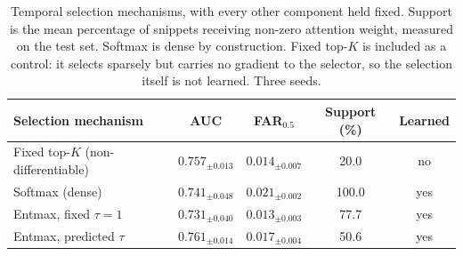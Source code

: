 \begin{table}[htbp]
\centering
\caption{Temporal selection mechanisms, with every other component held fixed. Support is the mean percentage of snippets receiving non-zero attention weight, measured on the test set. Softmax is dense by construction. Fixed top-$K$ is included as a control: it selects sparsely but carries no gradient to the selector, so the selection itself is not learned. Three seeds.}
\label{tab:selection}
\small
\begin{tabular}{lcccc}
\toprule
Selection mechanism & AUC & FAR$_{0.5}$ & Support (\%) & Learned \\
\midrule
Fixed top-$K$ (non-differentiable) & $0.757_{\pm0.013}$ & $0.014_{\pm0.007}$ & 20.0 & no \\
Softmax (dense) & $0.741_{\pm0.048}$ & $0.021_{\pm0.002}$ & 100.0 & yes \\
Entmax, fixed $\tau=1$ & $0.731_{\pm0.040}$ & $\mathbf{0.013}_{\pm0.003}$ & 77.7 & yes \\
Entmax, predicted $\tau$ & $\mathbf{0.761}_{\pm0.014}$ & $0.017_{\pm0.004}$ & 50.6 & yes \\
\bottomrule
\end{tabular}
\end{table}
